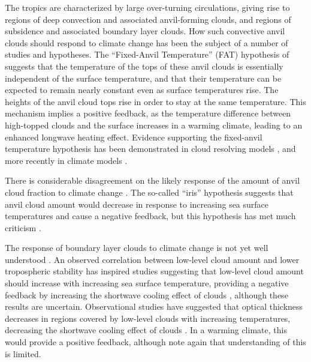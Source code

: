 The tropics are characterized by large over-turning circulations, giving rise to regions of deep convection and associated anvil-forming clouds, and regions of subsidence and associated boundary layer clouds. How such convective anvil clouds should respond to climate change has been the subject of a number of studies and hypotheses. The ``Fixed-Anvil Temperature'' (FAT) hypothesis of \cite{hartmann_and_larson_2002} suggests that the temperature of the tops of these anvil clouds is essentially independent of the surface temperature, and that their temperature can be expected to remain nearly constant even as surface temperatures rise. The heights of the anvil cloud tops rise in order to stay at the same temperature. This mechanism implies a positive feedback, as the temperature difference between high-topped clouds and the surface increases in a warming climate, leading to an enhanced longwave heating effect. Evidence supporting the fixed-anvil temperature hypothesis has been demonstrated in cloud resolving models \citep{kuang_and_hartmann_2007}, and more recently in climate models \citep{zelinka_and_hartmann_2010}.

There is considerable disagreement on the likely response of the amount of anvil cloud fraction to climate change \citep{ar4_ch8}. The so-called ``iris'' hypothesis \citep{lindzen_et_al_2001} suggests that anvil cloud amount would decrease in response to increasing sea surface temperatures and cause a negative feedback, but this hypothesis has met much criticism \citep{chambers_et_al_2002,del_genio_and_kovari_2002,fu_et_al_2002,harrison_2002,hartmann_and_michelsen_2002,lin_et_al_2002,lin_et_al_2004}.

The response of boundary layer clouds to climate change is not yet well understood \citep{ar4_ch8}. An observed correlation between low-level cloud amount and lower tropospheric stability \citep{klein_and_hartmann_1993} has inspired studies suggesting that low-level cloud amount should increase with increasing sea surface temperature, providing a negative feedback by increasing the shortwave cooling effect of clouds \citep{miller_1997,zhang_2004}, although these results are uncertain. Observational studies have suggested that optical thickness decreases in regions covered by low-level clouds with increasing temperatures, decreasing the shortwave cooling effect of clouds \citep{tselioudis_and_rossow_1994,greenwald_et_al_1995,bony_et_al_1997,del_genio_and_wolf_2000,bony_and_dufresne_2005}. In a warming climate, this would provide a positive feedback, although \cite{ar4_ch8} note again that understanding of this is limited.

